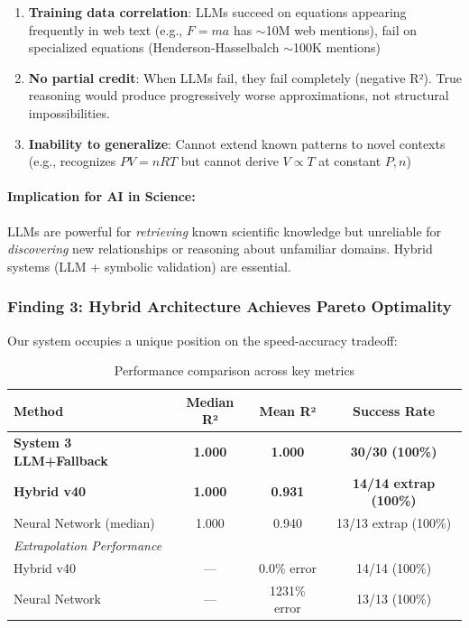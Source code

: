 \begin{enumerate}
    \item \textbf{Training data correlation}: LLMs succeed on equations appearing frequently in web text (e.g., $F = ma$ has $\sim$10M web mentions), fail on specialized equations (Henderson-Hasselbalch $\sim$100K mentions)

    \item \textbf{No partial credit}: When LLMs fail, they fail completely (negative R²). True reasoning would produce progressively worse approximations, not structural impossibilities.

    \item \textbf{Inability to generalize}: Cannot extend known patterns to novel contexts (e.g., recognizes $PV = nRT$ but cannot derive $V \propto T$ at constant $P,n$)
\end{enumerate}

\paragraph{Implication for AI in Science:}

LLMs are powerful for \emph{retrieving} known scientific knowledge but unreliable for \emph{discovering} new relationships or reasoning about unfamiliar domains. Hybrid systems (LLM + symbolic validation) are essential.


\subsubsection{Finding 3: Hybrid Architecture Achieves Pareto Optimality}

Our system occupies a unique position on the speed-accuracy tradeoff:

\begin{table}[h]
\centering
\begin{tabular}{lccc}
\toprule
\textbf{Method} & \textbf{Median R²} & \textbf{Mean R²} & \textbf{Success Rate} \\
\midrule
\textbf{System 3 LLM+Fallback} & \textbf{1.000} & \textbf{1.000} & \textbf{30/30 (100\%)} \\
\textbf{Hybrid v40} & \textbf{1.000} & \textbf{0.931} & \textbf{14/14 extrap (100\%)} \\
Neural Network (median) & 1.000 & 0.940 & 13/13 extrap (100\%) \\
\midrule
\multicolumn{4}{l}{\textit{Extrapolation Performance}} \\
Hybrid v40 & --- & 0.0\% error & 14/14 (100\%) \\
Neural Network & --- & 1231\% error & 13/13 (100\%) \\
\bottomrule
\end{tabular}
\caption{Performance comparison across key metrics}
\label{tab:pareto_frontier}
\end{table}

